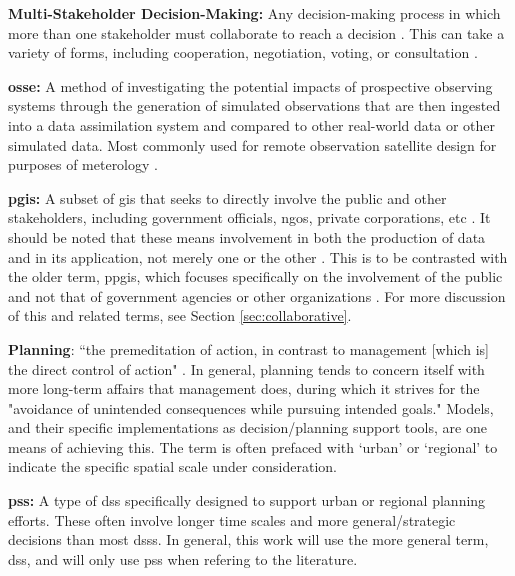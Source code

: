 \documentclass[notitlepage]{article}
\begin{document}
\textbf{Multi-Stakeholder Decision-Making:} Any decision-making process in which more than one stakeholder must collaborate to reach a decision \cite{fitzgeraldRecommendationsFramingMultistakeholder2016}. This can take a variety of forms, including cooperation, negotiation, voting, or consultation \cite{garberMultiStakeholderTradeSpace2015}.

\textbf{\acf{osse}:} A method of investigating the potential impacts of prospective observing systems through the generation of simulated observations that are then ingested into a data assimilation system and compared to other real-world data or other simulated data. Most commonly used for remote observation satellite design for purposes of meterology \cite{masutaniObservingSystemSimulation2010} .


\textbf{\acf{pgis}:} A subset of \ac{gis} that seeks to directly involve the public and other stakeholders, including government officials, \acp{ngo}, private corporations, etc \cite{sieberPublicParticipationGeographic2006}. It should be noted that these means involvement in both the production of data and in its application, not merely one or the other \cite{weinerParticipatoryGeographicInformation2007, talenBottomUpGIS2000}. This is to be contrasted with the older term, \ac{ppgis}, which focuses specifically on the involvement of the public and not that of government agencies or other organizations \cite{sieberPublicParticipationGeographic2006}. For more discussion of this and related terms, see Section \ref{sec:collaborative}.

\textbf{Planning}: ``the premeditation of action, in contrast to management [which is] the direct control of action" \cite{harrisLocationalModelsGeographic1993}. In general, planning tends to concern itself with more long-term affairs that management does, during which it strives for the "avoidance of unintended consequences while pursuing intended goals." Models, and their specific implementations as decision/planning support tools, are one means of achieving this. The term is often prefaced with `urban' or `regional' to indicate the specific spatial scale under consideration.

\textbf{\acf{pss}:} A type of \ac{dss} specifically designed to support urban or regional planning efforts. These often involve longer time scales and more general/strategic decisions than most \acp{dss}. In general, this work will use the more general term, \ac{dss}, and will only use \ac{pss} when refering to the literature.
\end{document}
